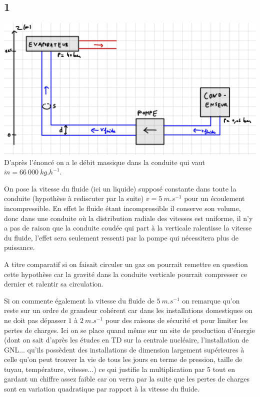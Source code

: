 \documentclass[12pt]{article}
\begin{document}
\subsection*{1}
\includegraphics[scale=0.25]{2 image.jpg} \\
D'après l'énoncé on a le débit massique dans la conduite qui vaut $\dot m = 66\ 000 \ kg.h^{-1}$.

On pose la vitesse du fluide (ici un liquide) supposé constante dans toute la conduite (hypothèse à rediscuter par la suite) $v=5 \ m.s^{-1}$ pour un écoulement incompressible. En effet le fluide étant incompressible il conserve son volume, donc dans une conduite où la distribution radiale des vitesses est uniforme, il n'y a pas de raison que la conduite coudée qui part à la verticale ralentisse la vitesse du fluide, l'effet sera seulement ressenti par la pompe qui nécessitera plus de puissance.

A titre comparatif si on faisait circuler un gaz on pourrait remettre en question cette hypothèse car la gravité dans la conduite verticale pourrait compresser ce dernier et ralentir sa circulation. 

Si on commente également la vitesse du fluide de $5 \ m.s^{-1}$ on remarque qu'on reste sur un ordre de grandeur cohérent car dans les installations domestiques on ne doit pas dépasser $1$ à $2 \ m.s^{-1}$ pour des raisons de sécurité et pour limiter les pertes de charges. Ici on se place quand même sur un site de production d'énergie (dont on sait d'après les études en TD sur la centrale nucléaire, l'installation de GNL... qu'ils possèdent des installations de dimension largement supérieures à celle qu'on peut trouver la vie de tous les jours en terme de pression, taille de tuyau, température, vitesse...) ce qui justifie la multiplication par 5 tout en gardant un chiffre assez faible car on verra par la suite que les pertes de charges sont en variation quadratique par rapport à la vitesse du fluide.
\end{document}
